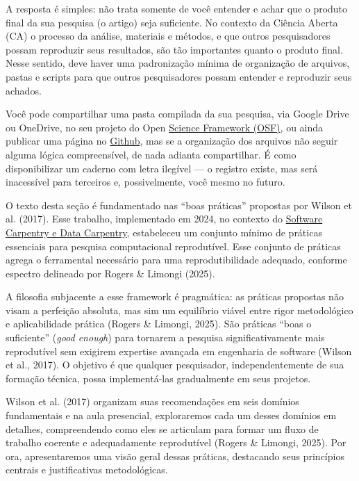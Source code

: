 \documentclass[
  a4paper,
]{book}
\begin{document}
A resposta é simples: não trata somente de você entender e achar que o
produto final da sua pesquisa (o artigo) seja suficiente. No contexto da
Ciência Aberta (CA) o processo da análise, materiais e métodos, e que
outros pesquisadores possam reproduzir seus resultados, são tão
importantes quanto o produto final. Nesse sentido, deve haver uma
padronização mínima de organização de arquivos, pastas e scripts para
que outros pesquisadores possam entender e reproduzir seus achados.

Você pode compartilhar uma pasta compilada da sua pesquisa, via Google
Drive ou OneDrive, no seu projeto do Open \href{https://osf.io/}{Science
Framework (OSF)}, ou ainda publicar uma página no
\href{https://github.com/}{Github}, mas se a organização dos arquivos
não seguir alguma lógica compreensível, de nada adianta compartilhar. É
como disponibilizar um caderno com letra ilegível --- o registro existe,
mas será inacessível para terceiros e, possivelmente, você mesmo no
futuro.

O texto desta seção é fundamentado nas ``boas práticas'' propostas por
Wilson et al. (2017). Esse trabalho, implementado em 2024, no contexto
do
\href{https://carpentries-lab.github.io/good-enough-practices/}{Software
Carpentry e Data Carpentry}, estabeleceu um conjunto mínimo de práticas
essenciais para pesquisa computacional reprodutível. Esse conjunto de
práticas agrega o ferramental necessário para uma reprodutibilidade
adequado, conforme espectro delineado por Rogers \& Limongi (2025).

A filosofia subjacente a esse framework é pragmática: as práticas
propostas não visam a perfeição absoluta, mas sim um equilíbrio viável
entre rigor metodológico e aplicabilidade prática (Rogers \& Limongi,
2025). São práticas ``boas o suficiente'' (\emph{good enough}) para
tornarem a pesquisa significativamente mais reprodutível sem exigirem
expertise avançada em engenharia de software (Wilson et al., 2017). O
objetivo é que qualquer pesquisador, independentemente de sua formação
técnica, possa implementá-las gradualmente em seus projetos.

Wilson et al. (2017) organizam suas recomendações em seis domínios
fundamentais e na aula presencial, exploraremos cada um desses domínios
em detalhes, compreendendo como eles se articulam para formar um fluxo
de trabalho coerente e adequadamente reprodutível (Rogers \& Limongi,
2025). Por ora, apresentaremos uma visão geral dessas práticas,
destacando seus princípios centrais e justificativas metodológicas.
\end{document}
